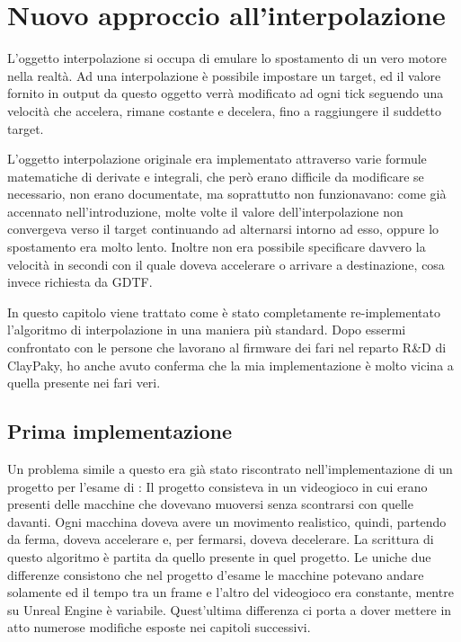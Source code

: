 \documentclass[main.tex]{subfiles}
\begin{document}
\sloppy

\vspace{1.0cm}

\section{Nuovo approccio all'interpolazione}\label{sec:Interpolation}
\lstset{language=UEcpp}
L'oggetto interpolazione si occupa di emulare lo spostamento di un vero motore nella realtà. Ad una interpolazione è possibile impostare un target, ed il valore fornito in output da questo oggetto verrà modificato ad ogni tick seguendo una velocità che accelera, rimane costante e decelera, fino a raggiungere il suddetto target.

L'oggetto interpolazione originale era implementato attraverso varie formule matematiche di derivate e integrali, che però erano difficile da modificare se necessario, non erano documentate, ma soprattutto non funzionavano: come già accennato nell'introduzione, molte volte il valore dell'interpolazione non convergeva verso il target continuando ad alternarsi intorno ad esso, oppure lo spostamento era molto lento. Inoltre non era possibile specificare davvero la velocità in secondi con il quale doveva accelerare o arrivare a destinazione, cosa invece richiesta da GDTF.\newline

In questo capitolo viene trattato come è stato completamente re-implementato l'algoritmo di interpolazione in una maniera più standard. Dopo essermi confrontato con le persone che lavorano al firmware dei fari nel reparto R\&D di ClayPaky, ho anche avuto conferma che la mia implementazione è molto vicina a quella presente nei fari veri.

\subsection{Prima implementazione}\label{subsec:4_trafficImplementation}
Un problema simile a questo era già stato riscontrato nell'implementazione di un progetto per l'esame di  \cite{TrafficGame}: Il progetto consisteva in un videogioco in cui erano presenti delle macchine che dovevano muoversi senza scontrarsi con quelle davanti. Ogni macchina doveva avere un movimento realistico, quindi, partendo da ferma, doveva accelerare e, per fermarsi, doveva decelerare. La scrittura di questo algoritmo è partita da quello presente in quel progetto. Le uniche due differenze consistono che nel progetto d'esame le macchine potevano andare solamente  ed il tempo tra un frame e l'altro del videogioco era constante, mentre su Unreal Engine è variabile. Quest'ultima differenza ci porta a dover mettere in atto numerose modifiche esposte nei capitoli successivi.\newline
\end{document}
